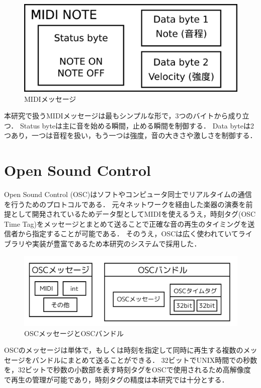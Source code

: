 \begin{figure}[htbp]
  \centering
  \includegraphics[width=0.8\linewidth]{src/img/midi_spec.png}
  \caption{MIDIメッセージ\cite{midi}}
  \label{fig:midi}
\end{figure}

本研究で扱うMIDIメッセージは最もシンプルな形で，3つのバイトから成り立つ．
Status byteは主に音を始める瞬間，止める瞬間を制御する．
Data byteは2つあり，一つは音程を扱い，もう一つは強度，音の大きさや激しさを制御する．

\section{Open Sound Control}
Open Sound Control (OSC)\cite{opensoundcontrol}はソフトやコンピュータ同士でリアルタイムの通信を行うためのプロトコルである．
元々ネットワークを経由した楽器の演奏を前提として開発されているためデータ型としてMIDIを使えるうえ，時刻タグ(OSC Time Tag)をメッセージとまとめて送ることで正確な音の再生のタイミングを送信者から指定することが可能である．
そのうえ，OSCは広く使われていてライブラリや実装が豊富であるため本研究のシステムで採用した．

\begin{figure}[htbp]
  \centering
  \includegraphics[width=0.8\linewidth]{src/img/g1736.png}
  \caption{OSCメッセージとOSCバンドル}
  \label{fig:oscmess}
\end{figure}

OSCのメッセージは単体で，もしくは時刻を指定して同時に再生する複数のメッセージをバンドルにまとめて送ることができる．
32ビットでUNIX時間での秒数を，32ビットで秒数の小数部を表す時刻タグをOSCで使用されるため高解像度で再生の管理が可能であり，時刻タグの精度は本研究では十分とする．

